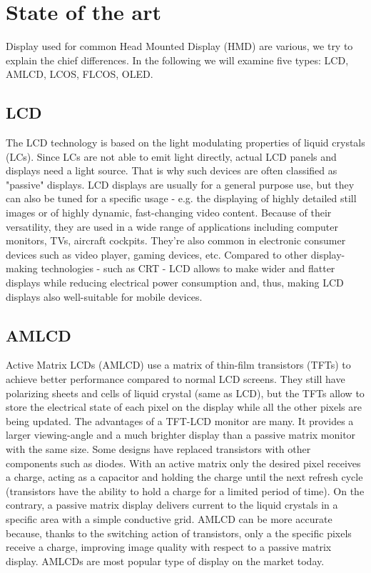 \section{State of the art}
\label{stateart}
%

%
Display used for common Head Mounted Display (HMD) are 
various, we try to explain the chief differences. In the
following we will examine five types: LCD, AMLCD, LCOS, 
FLCOS, OLED.
%

%
\subsection{LCD}
The LCD technology is based on the light modulating properties 
of liquid crystals (LCs). Since LCs are not able to emit light 
directly, actual LCD panels and displays need a light source.
%
That is why such devices are often classified as "passive" 
displays. 
%
LCD displays are usually for a general purpose use, but they 
can also be tuned for a specific usage - e.g. the displaying 
of highly detailed still images or of highly dynamic, 
fast-changing video content.
%
Because of their versatility, they are used in a wide range 
of applications including computer monitors, TVs, aircraft 
cockpits. They're also common in electronic consumer devices 
such as video player, gaming devices, etc.
%
Compared to other display-making technologies - such as CRT - 
LCD allows to make wider and flatter displays while reducing 
electrical power consumption and, thus, making LCD displays 
also well-suitable for mobile devices.
%

%
\subsection{AMLCD}
Active Matrix LCDs (AMLCD) use a matrix of thin-film transistors 
(TFTs) to achieve better performance compared to normal LCD screens. 
They still have polarizing sheets and cells of liquid crystal 
(same as LCD), but the TFTs allow to store the electrical state 
of each pixel on the display while all the other pixels are 
being updated.
%
The advantages of a TFT-LCD monitor are many. It provides a 
larger viewing-angle and a much brighter display than a passive 
matrix monitor with the same size. Some designs have replaced 
transistors with other components such as diodes.
%
With an active matrix only the desired pixel receives a charge, 
acting as a capacitor and holding the charge until the next refresh 
cycle (transistors have the ability to hold a charge for a limited 
period of time). On the contrary, a passive matrix display delivers 
current to the liquid crystals in a specific area with a simple 
conductive grid. AMLCD can be more accurate because, thanks to 
the switching action of transistors, only a the specific pixels 
receive a charge, improving image quality with respect to a 
passive matrix display.
%
AMLCDs are most popular type of display on the market today.

